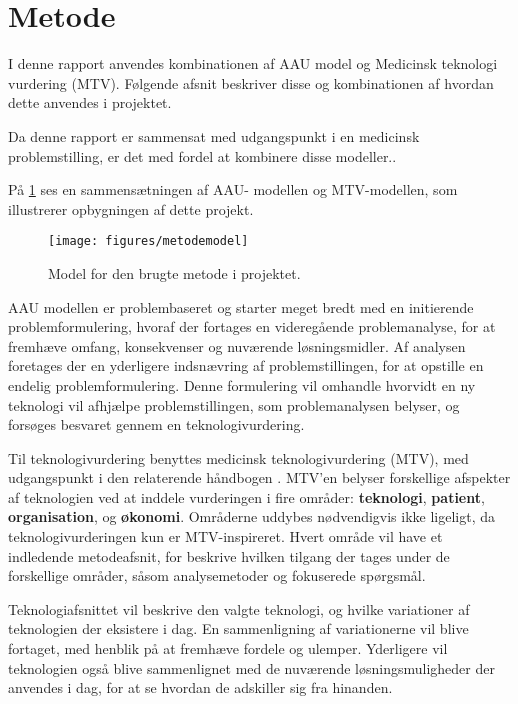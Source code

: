 \section{Metode} \label{metode}
I denne rapport anvendes kombinationen af AAU model og Medicinsk teknologi vurdering (MTV). Følgende afsnit beskriver disse og kombinationen af hvordan dette anvendes i projektet. 

Da denne rapport er sammensat med udgangspunkt i en medicinsk problemstilling, er det med fordel at kombinere disse modeller..

På \ref{fig:metodemodel} ses en sammensætningen af AAU- modellen og MTV-modellen, som illustrerer opbygningen af dette projekt.

\begin{figure}[H]
	\centering
	\texttt{[image: figures/metodemodel]}
	\caption{Model for den brugte metode i projektet.}
	\label{fig:metodemodel}
\end{figure}

AAU modellen er problembaseret og starter meget bredt med en initierende problemformulering, hvoraf der fortages en videregående problemanalyse, for at fremhæve omfang, konsekvenser og nuværende løsningsmidler. 
Af analysen foretages der en yderligere indsnævring af problemstillingen, for at opstille en endelig problemformulering. Denne formulering vil omhandle hvorvidt en ny teknologi vil afhjælpe problemstillingen, som problemanalysen belyser, og forsøges besvaret gennem en teknologivurdering. 



Til teknologivurdering benyttes medicinsk teknologivurdering (MTV), med udgangspunkt i den relaterende håndbogen \citep{mtvhaandbog}. 
MTV'en belyser forskellige afspekter af teknologien ved at inddele vurderingen i fire områder: \textbf{teknologi}, \textbf{patient}, \textbf{organisation}, og \textbf{økonomi}. Områderne uddybes nødvendigvis ikke ligeligt, da teknologivurderingen kun er MTV-inspireret. 
Hvert område vil have et indledende metodeafsnit, for beskrive hvilken tilgang der tages under de forskellige områder, såsom analysemetoder og fokuserede spørgsmål. 

Teknologiafsnittet vil beskrive den valgte teknologi, og hvilke variationer af teknologien der eksistere i dag. En sammenligning af variationerne vil blive fortaget, med henblik på at fremhæve fordele og ulemper. Yderligere vil teknologien også blive sammenlignet med de nuværende løsningsmuligheder der anvendes i dag, for at se hvordan de adskiller sig fra hinanden.  

